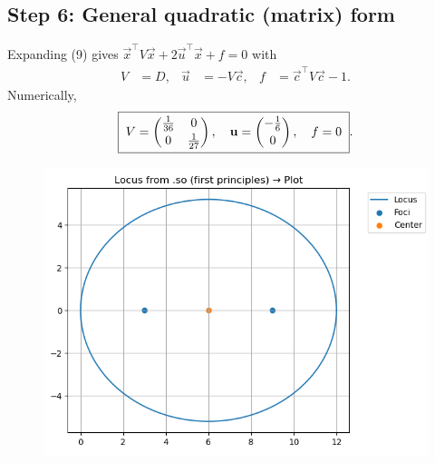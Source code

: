 \documentclass[12pt]{article}
\begin{document}
\subsection*{Step 6: General quadratic (matrix) form}
Expanding (9) gives $\vec x^\top V\vec x+2\vec u^\top\vec x+f=0$ with
\begin{align}
V &= D, &
\vec u &= -V\vec c, &
f &= \vec c^\top V\vec c - 1.
\end{align}
Numerically,
\begin{align}
\boxed{\;
V=\begin{pmatrix}\tfrac{1}{36}&0\\[2pt]0&\tfrac{1}{27}\end{pmatrix},\quad
\mathbf u=\begin{pmatrix}-\tfrac{1}{6}\\[2pt]0\end{pmatrix},\quad
f=0\; }.
\end{align}

\begin{figure}[H]
    \centering
    \includegraphics[width=0.9\columnwidth]{figs/ellipse.png}
    \caption{}
    \label{fig:placeholder}
\end{figure}
\end{document}
